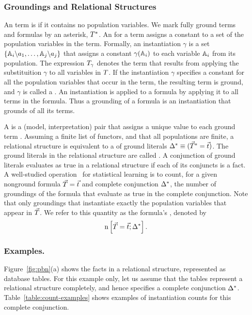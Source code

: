 \documentclass[twoside,11pt]{article}
\begin{document}
\subsubsection{Groundings and Relational Structures}
An term is  if it contains no population variables. We mark fully ground terms and formulas by an asterisk, $T^{*}\hspace{0.0ex}$. An   for a term assigns a constant to a set of the population variables in the term. Formally, an instantiation $\gamma$ is a set $\{\mathbb{A}_{i}\backslash a_{1},\ldots,\mathbb{A}_{j}\backslash a_{j}\}$ 
that assigns a constant $\gamma(\mathbb{A}_{i})$ to each variable $\mathbb{A}_{i}$ from its population. The expression $T_\gamma$ denotes the term that results from applying the substituition $\gamma$ to all variables in $T$. If the instantiation $\gamma$ specifies a constant for all the population variables that occur in the term, the resulting term is ground, and $\gamma$ is called a . An instantiation is applied to a formula by applying it to all terms in the formula. Thus a grounding of a formula is an instantiation that grounds of all its terms.


A  is a (model, interpretation) pair that assigns a unique value to each ground term \cite{Chiang2012}. Assuming a finite list of functors, and that all populations are finite, a relational structure is equivalent to a  of ground literals $\Delta^{*}\hspace{0.0ex} \equiv (\vec{T}^{*}\hspace{0.0ex} = \vec{t}\hspace{0.0ex})$. The ground literals in the relational structure are called . A conjunction of ground literals evaluates as true in a relational structure if each of its conjuncts is a fact. A well-studied operation~\cite{Schulte2013} for statistical learning is to count, for a given nonground formula $\vec{T} = \vec{t}\hspace{0.0ex}$ and complete conjunction $\Delta^{*}\hspace{0.0ex}$, the number of groundings of the formula that evaluate as true in the complete conjunction. Note that only groundings that instantiate exactly the population variables that appear in $\vec{T}$. We refer to this quantity as the formula's , denoted by $$\mathrm{n}\left[\vec{T} = \vec{t}\hspace{0.0ex};\Delta^{*}\hspace{0.0ex}\right].$$

\subsubsection{Examples.}

Figure~\ref{fig:pbn}(a) shows the facts in a relational structure, represented as database tables. For this example only, let us assume that the tables represent a relational structure completely, and hence specifies a complete conjunction $\Delta^{*}\hspace{0.0ex}$. Table~\ref{table:count-examples} shows examples of instantiation counts for this complete conjunction.
\end{document}
